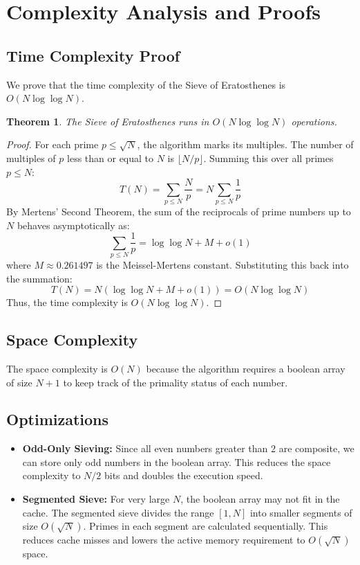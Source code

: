 \documentclass[10pt,journal,compsoc,onecolumn]{IEEEtran}
\newtheorem{theorem}{Theorem}
\begin{document}
\section{Complexity Analysis and Proofs}
\label{sec:complexity}

\subsection{Time Complexity Proof}
We prove that the time complexity of the Sieve of Eratosthenes is $O(N \log \log N)$.

\begin{theorem}
The Sieve of Eratosthenes runs in $O(N \log \log N)$ operations.
\end{theorem}
\begin{proof}
For each prime $p \leq \sqrt{N}$, the algorithm marks its multiples. The number of multiples of $p$ less than or equal to $N$ is $\lfloor N/p \rfloor$. Summing this over all primes $p \leq N$:
\[
T(N) = \sum_{p \leq N} \frac{N}{p} = N \sum_{p \leq N} \frac{1}{p}
\]
By Mertens' Second Theorem, the sum of the reciprocals of prime numbers up to $N$ behaves asymptotically as:
\[
\sum_{p \leq N} \frac{1}{p} = \log \log N + M + o(1)
\]
where $M \approx 0.261497$ is the Meissel-Mertens constant.
Substituting this back into the summation:
\[
T(N) = N (\log \log N + M + o(1)) = O(N \log \log N)
\]
Thus, the time complexity is $O(N \log \log N)$.
\end{proof}

\subsection{Space Complexity}
The space complexity is $O(N)$ because the algorithm requires a boolean array of size $N + 1$ to keep track of the primality status of each number.

\subsection{Optimizations}
\begin{itemize}
    \item \textbf{Odd-Only Sieving:} Since all even numbers greater than $2$ are composite, we can store only odd numbers in the boolean array. This reduces the space complexity to $N/2$ bits and doubles the execution speed.
    \item \textbf{Segmented Sieve:} For very large $N$, the boolean array may not fit in the cache. The segmented sieve divides the range $[1, N]$ into smaller segments of size $O(\sqrt{N})$. Primes in each segment are calculated sequentially. This reduces cache misses and lowers the active memory requirement to $O(\sqrt{N})$ space.
\end{itemize}
\end{document}
